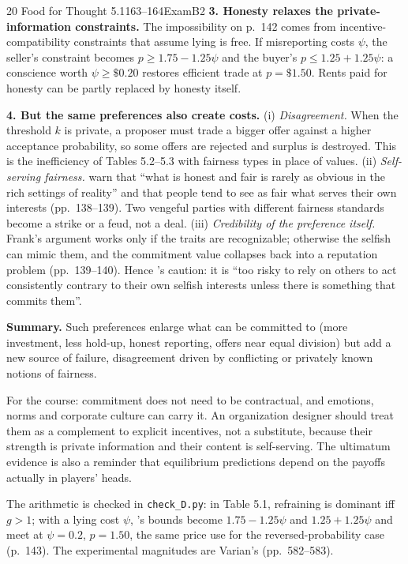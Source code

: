 \begin{exsol}{20}{\MR{} Food for Thought 5.1}{163--164}{Exam}{B2}
\textbf{3. Honesty relaxes the private-information constraints.} The impossibility on p.~142
comes from incentive-compatibility constraints that assume lying is free. If misreporting costs
$\psi$, the seller's constraint becomes $p \ge 1.75 - 1.25\psi$ and the buyer's
$p \le 1.25 + 1.25\psi$: a conscience worth $\psi \ge \$0.20$ restores efficient trade at
$p = \$1.50$. Rents paid for honesty can be partly replaced by honesty itself.

\textbf{4. But the same preferences also create costs.} (i) \emph{Disagreement.} When the
threshold $k$ is private, a proposer must trade a bigger offer against a higher acceptance
probability, so some offers are rejected and surplus is destroyed. This is the inefficiency of
Tables 5.2--5.3 with fairness types in place of values. (ii) \emph{Self-serving fairness.} \MR{}
warn that ``what is honest and fair is rarely as obvious in the rich settings of reality'' and
that people tend to see as fair what serves their own interests (pp.~138--139). Two vengeful
parties with different fairness standards become a strike or a feud, not a deal. (iii)
\emph{Credibility of the preference itself.} Frank's argument works only if the traits are
recognizable; otherwise the selfish can mimic them, and the commitment value collapses back into
a reputation problem (pp.~139--140). Hence \MR's caution: it is ``too risky to rely on others to
act consistently contrary to their own selfish interests unless there is something that commits
them''.

\textbf{Summary.} Such preferences enlarge what can be committed to (more investment, less
hold-up, honest reporting, offers near equal division) but add a new source of failure,
disagreement driven by conflicting or privately known notions of fairness.

\interp For the course: commitment does not need to be contractual, and emotions, norms and
corporate culture can carry it. An organization designer should treat them as a complement to
explicit incentives, not a substitute, because their strength is private information and their
content is self-serving. The ultimatum evidence is also a reminder that equilibrium predictions
depend on the payoffs actually in players' heads.

\verify The arithmetic is checked in \texttt{check\_D.py}: in Table 5.1, refraining is dominant
iff $g > 1$; with a lying cost $\psi$, \MR's bounds become $1.75 - 1.25\psi$ and
$1.25 + 1.25\psi$ and meet at $\psi = 0.2$, $p = 1.50$, the same price \MR{} use for the
reversed-probability case (p.~143). The experimental magnitudes are Varian's (pp.~582--583).


\end{exsol}
